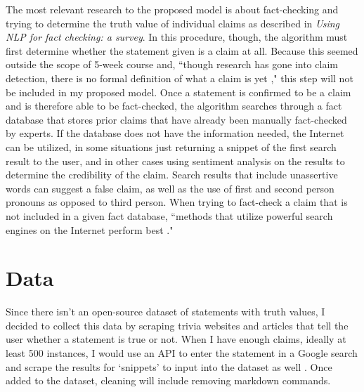 \documentclass[]{article}
\begin{document}
		The most relevant research to the proposed model is about fact-checking and trying to determine the truth value of individual claims as described in \textit{Using NLP for fact checking: a survey}. In this procedure, though, the algorithm must first determine whether the statement given is a claim at all. Because this seemed outside the scope of 5-week course and, ``though research has gone into claim detection, there is no formal definition of what a claim is yet \cite{lazarski21}," this step will not be included in my proposed model. Once a statement is confirmed to be a claim and is therefore able to be fact-checked, the algorithm searches through a fact database that stores prior claims that have already been manually fact-checked by experts. If the database does not have the information needed, the Internet can be utilized, in some situations just returning a snippet of the first search result to the user, and in other cases using sentiment analysis on the results to determine the credibility of the claim. Search results that include unassertive words can suggest a false claim, as well as the use of first and second person pronouns as opposed to third person. When trying to fact-check a claim that is not included in a given fact database, ``methods that utilize powerful search engines on the Internet perform best \cite{lazarski21}."
			
	
	\section{Data}
	
		
		Since there isn't an open-source dataset of statements with truth values, I decided to collect this data by scraping trivia websites and articles that tell the user whether a statement is true or not. When I have enough claims, ideally at least 500 instances, I would use an API to enter the statement in a Google search and scrape the results for `snippets' to input into the dataset as well \cite{k_api}. Once added to the dataset, cleaning will include removing markdown commands.
		
		
\end{document}
